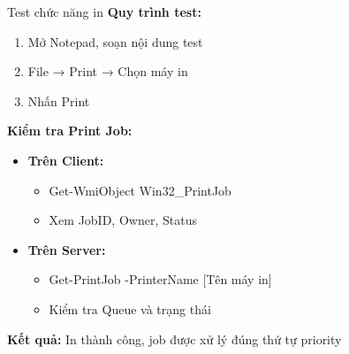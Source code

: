 \documentclass{beamer}
\begin{document}
    \begin{frame}{Test chức năng in}
        \textbf{Quy trình test:}
        \begin{enumerate}
            \item Mở Notepad, soạn nội dung test
            \item File → Print → Chọn máy in
            \item Nhấn Print
        \end{enumerate}
        
        \vspace{0.3cm}
        \textbf{Kiểm tra Print Job:}
        \begin{itemize}
            \item \textbf{Trên Client:}
                \begin{itemize}
                    \item Get-WmiObject Win32\_PrintJob
                    \item Xem JobID, Owner, Status
                \end{itemize}
            \item \textbf{Trên Server:}
                \begin{itemize}
                    \item Get-PrintJob -PrinterName [Tên máy in]
                    \item Kiểm tra Queue và trạng thái
                \end{itemize}
        \end{itemize}
        
        \vspace{0.3cm}
        \textbf{Kết quả:} In thành công, job được xử lý đúng thứ tự priority
    \end{frame}

\end{document}
